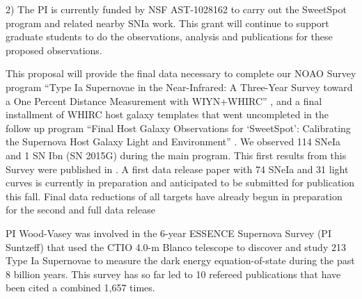 \documentclass[11pt]{article}
\begin{document}
2) The PI is currently funded by NSF AST-1028162 to carry out the SweetSpot program and related nearby SNIa work.  This grant will continue to support graduate students to do the observations, analysis and publications for these proposed observations.  

%
%
%
%
%


%

\thepast

This proposal will provide the final data necessary to complete our NOAO Survey 
program ``Type Ia Supernovae in the Near-Infrared: A Three-Year Survey toward a One Percent Distance Measurement with WIYN+WHIRC'' ,
and a final installment of WHIRC host galaxy templates that went uncompleted in the follow up program
``Final Host Galaxy Observations for `SweetSpot': Calibrating the Supernova Host Galaxy Light and Environment''
.
We observed 114 SNeIa and 1 SN Ibn (SN 2015G) during the main program.
This first results from this Survey were published in \cite{weyant11}.  
A first data release paper with 74 SNeIa and 31 light curves is currently in preparation and anticipated to be submitted for publication this fall.
Final data reductions of all targets have already begun in preparation for the second and full data release

PI Wood-Vasey was involved in the 6-year ESSENCE Supernova Survey (PI Suntzeff) that used the CTIO 4.0-m Blanco telescope to discover and study 213 Type Ia Supernovae to measure the dark energy equation-of-state during the past 8 billion years.  This survey has so far led to 10 refereed publications that have been cited a combined 1,657 times.
\end{document}

